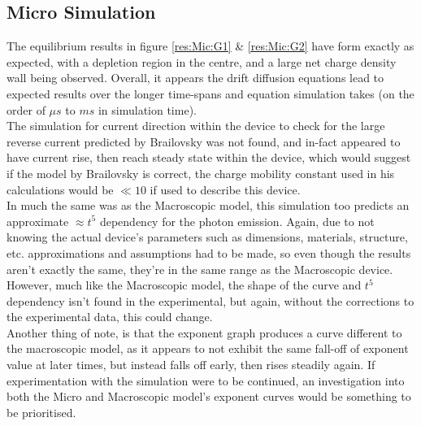 \documentclass[titlepage]{article}
\begin{document}
\subsection{Micro Simulation}
The equilibrium results in figure \ref{res:Mic:G1} \& \ref{res:Mic:G2} have form exactly as expected, with a depletion region in the centre, and a large net charge density wall being observed. Overall, it appears the drift diffusion equations lead to expected results over the longer time-spans and equation simulation takes (on the order of $\mu s$ to $ms$ in simulation time). \\
The simulation for current direction within the device to check for the large reverse current predicted by Brailovsky was not found, and in-fact appeared to have current rise, then reach steady state within the device, which would suggest if the model by Brailovsky is correct, the charge mobility constant used in his calculations would be $\ll 10$ if used to describe this device.\\
In much the same was as the Macroscopic model, this simulation too predicts an approximate $\approx t^5$ dependency for the photon emission. Again, due to not knowing the actual device's parameters such as dimensions, materials, structure, etc. approximations and assumptions had to be made, so even though the results aren't exactly the same, they're in the same range as the Macroscopic device. However, much like the Macroscopic model, the shape of the curve and $t^5$ dependency isn't found in the experimental, but again, without the corrections to the experimental data, this could change.\\
Another thing of note, is that the exponent graph produces a curve different to the macroscopic model, as it appears to not exhibit the same fall-off of exponent value at later times, but instead falls off early, then rises steadily again. If experimentation with the simulation were to be continued, an investigation into both the Micro and Macroscopic model's exponent curves would be something to be prioritised.\\
\end{document}
